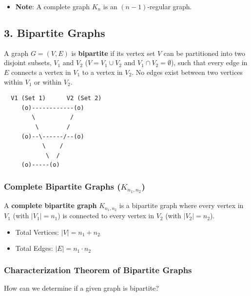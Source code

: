 \documentclass[
]{book}
\providecommand{\tightlist}{%
  \setlength{\itemsep}{0pt}\setlength{\parskip}{0pt}}
\theoremstyle{definition}
\theoremstyle{definition}
\theoremstyle{definition}
\theoremstyle{definition}
\theoremstyle{remark}
\begin{document}
\begin{itemize}
\tightlist
\item
  \textbf{Note}: A complete graph \(K_n\) is an \((n - 1)\)-regular graph.
\end{itemize}

\subsection{3. Bipartite Graphs}\label{bipartite-graphs}

A graph \(G = (V, E)\) is \textbf{bipartite} if its vertex set \(V\) can be partitioned into two disjoint subsets, \(V_1\) and \(V_2\) (\(V = V_1 \cup V_2\) and \(V_1 \cap V_2 = \emptyset\)), such that every edge in \(E\) connects a vertex in \(V_1\) to a vertex in \(V_2\). No edges exist between two vertices within \(V_1\) or within \(V_2\).

\begin{verbatim}
  V1 (Set 1)      V2 (Set 2)
     (o)------------(o)
        \          /
         \        /
     (o)--\------/--(o)
           \    /
            \  /
     (o)-----(o)
\end{verbatim}

\subsubsection{\texorpdfstring{Complete Bipartite Graphs (\(K_{n_1, n_2}\))}{Complete Bipartite Graphs (K\_\{n\_1, n\_2\})}}\label{complete-bipartite-graphs-k_n_1-n_2}

A \textbf{complete bipartite graph} \(K_{n_1, n_2}\) is a bipartite graph where every vertex in \(V_1\) (with \(\vert{}V_1\vert{} = n_1\)) is connected to every vertex in \(V_2\) (with \(\vert{}V_2\vert{} = n_2\)).

\begin{itemize}
\tightlist
\item
  Total Vertices: \(\vert{}V\vert{} = n_1 + n_2\)
\item
  Total Edges: \(\vert{}E\vert{} = n_1 \cdot n_2\)
\end{itemize}

\subsubsection{Characterization Theorem of Bipartite Graphs}\label{characterization-theorem-of-bipartite-graphs}

How can we determine if a given graph is bipartite?
\end{document}
